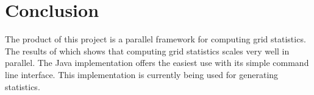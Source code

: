 \section{Conclusion}

\par
The product of this project is a parallel framework for computing grid statistics.
The results of which shows that computing grid statistics scales very well in parallel.
The Java implementation offers the easiest use with its simple command line interface.
This implementation is currently being used for generating statistics.